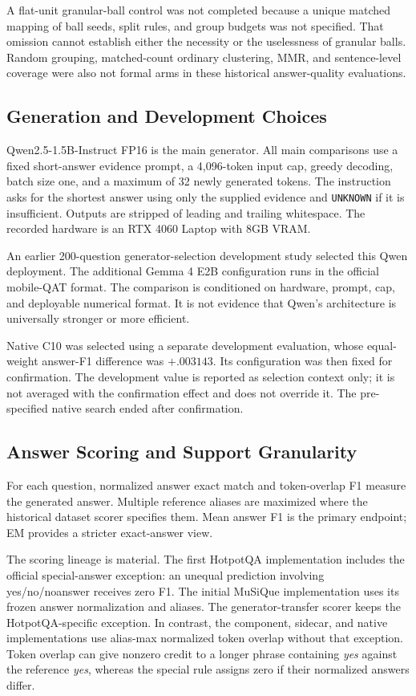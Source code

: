 \documentclass[11pt,a4paper]{article}
\begin{document}
A flat-unit granular-ball control was not completed because a unique matched
mapping of ball seeds, split rules, and group budgets was not specified.
That omission cannot establish either the necessity or the uselessness of
granular balls. Random grouping, matched-count ordinary clustering, MMR,
and sentence-level coverage were also not formal arms in these historical
answer-quality evaluations.

\subsection{Generation and Development Choices}
Qwen2.5-1.5B-Instruct FP16 is the main generator. All main comparisons use a
fixed short-answer evidence prompt, a 4,096-token input cap, greedy decoding,
batch size one, and a maximum of 32 newly generated tokens. The instruction
asks for the shortest answer using only the supplied evidence and
\texttt{UNKNOWN} if it is insufficient. Outputs are stripped of leading and
trailing whitespace. The recorded hardware is an RTX 4060 Laptop with 8GB
VRAM.

An earlier 200-question generator-selection development study selected this
Qwen deployment. The additional Gemma 4 E2B configuration runs in the official
mobile-QAT format. The comparison is conditioned on hardware, prompt, cap,
and deployable numerical format. It is not evidence that Qwen's architecture
is universally stronger or more efficient.

Native C10 was selected using a separate development evaluation, whose
equal-weight answer-F1 difference was $+.003143$. Its configuration was then
fixed for confirmation. The development value is reported as selection
context only; it is not averaged with the confirmation effect and does not
override it. The pre-specified native search ended after confirmation.

\subsection{Answer Scoring and Support Granularity}
For each question, normalized answer exact match and token-overlap F1 measure
the generated answer. Multiple reference aliases are maximized where the
historical dataset scorer specifies them. Mean answer F1 is the primary
endpoint; EM provides a stricter exact-answer view.

The scoring lineage is material. The first HotpotQA implementation includes
the official special-answer exception: an unequal prediction involving
yes/no/noanswer receives zero F1. The initial MuSiQue implementation uses
its frozen answer normalization and aliases. The generator-transfer scorer
keeps the HotpotQA-specific exception. In contrast, the component, sidecar,
and native implementations use alias-max normalized token overlap without
that exception. Token overlap can give nonzero credit to a longer phrase
containing \emph{yes} against the reference \emph{yes}, whereas the
special rule assigns zero if their normalized answers differ.
\end{document}
